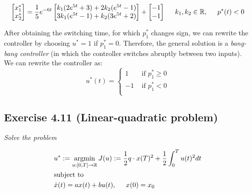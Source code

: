 \begin{equation}
\begin{bmatrix}
    x_1^*\\
    x_2^*
    \end{bmatrix}
    = \frac{1}{5} e^{-6t} 
    \begin{bmatrix}
    k_1  (2 e^{5 t} + 3) + 2 k_2 (e^{5 t} - 1) \\
    3k_1 ( e^{5 t} - 1) +  k_2 (3e^{5 t} + 2) \\
    \end{bmatrix}
    +
    \begin{bmatrix}
    -1\\
    -1\\
    \end{bmatrix}
    \hspace{0.5cm} k_1, k_2 \in \mathbb{R}, \hspace{0.5cm} p^*(t) < 0
\end{equation}

After obtaining the switching time, for which $p_1^*$ changes sign, we can rewrite the controller by choosing $u^* = 1$ if $p_1^* = 0$. Therefore, the general solution is a \emph{bang-bang controller} (in which the controller switches abruptly between two inputs). We can rewrite the controller as:
\begin{equation}
u^*(t) = 
    \begin{cases}
        1 &\text{ if } p_1^* \geq 0 \\
        -1 &\text{ if } p_1^* < 0 \\
    \end{cases}
\end{equation}



\subsection{Exercise 4.11 (Linear-quadratic problem)}

\emph{Solve the problem}

\begin{align}
    &u^* := \operatorname*{argmin}_{u:[0,T] \to \mathbb{R}} J(u) := \frac{1}{2}q \cdot x(T)^2 + \frac{1}{2} \int_0^T u(t) ^2 dt \\
    &\text{subject to}\\
    &\Dot{x}(t) = ax(t) + bu(t), \hspace{0.5cm} x(0) = x_0
\end{align}

